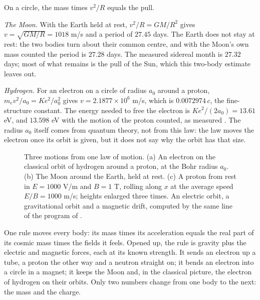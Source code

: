 \begin{workedexample}
On a circle, the mass times $v^2/R$ equals the pull.

\emph{The Moon.} With the Earth held at rest, $v^2/R = GM/R^2$ gives $v = \sqrt{GM/R} = 1018$ m/s and a period of $27.45$ days. The Earth does not stay at rest: the two bodies turn about their common centre, and with the Moon's own mass counted the period is $27.28$ days. The measured sidereal month is $27.32$ days; most of what remains is the pull of the Sun, which this two-body estimate leaves out.

\emph{Hydrogen.} For an electron on a circle of radius $a_0$ around a proton, $m_e v^2/a_0 = Ke^2/a_0^2$ gives $v = 2.1877 \times 10^6$ m/s, which is $0.0072974\,c$, the fine-structure constant. The energy needed to free the electron is $Ke^2/(2a_0) = 13.61$ eV, and $13.598$ eV with the motion of the proton counted, as measured \citep{Sansonetti2005}. The radius $a_0$ itself comes from quantum theory, not from this law: the law moves the electron once its orbit is given, but it does not say why the orbit has that size.
\end{workedexample}

\suppressfloats[t]
\begin{figure}[tb]
\myfloatalign

\caption[Orbits and drifts from one law]{Three motions from one law of motion. (a) An electron on the classical orbit of hydrogen around a proton, at the Bohr radius $a_0$. (b) The Moon around the Earth, held at rest. (c) A proton from rest in $E = 1000$ V/m and $B = 1$ T, rolling along $x$ at the average speed $E/B = 1000$ m/s; heights enlarged three times. An electric orbit, a gravitational orbit and a magnetic drift, computed by the same line of the program of .}
\label{fig:un-orbits}
\end{figure}

\begin{plainwords}
One rule moves every body: its mass times its acceleration equals the real part of its cosmic mass times the fields it feels. Opened up, the rule is gravity plus the electric and magnetic forces, each at its known strength. It sends an electron up a tube, a proton the other way and a neutron straight on; it bends an electron into a circle in a magnet; it keeps the Moon and, in the classical picture, the electron of hydrogen on their orbits. Only two numbers change from one body to the next: the mass and the charge.
\end{plainwords}

